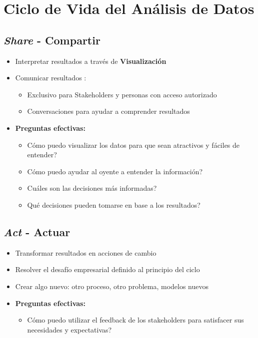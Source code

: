 \section{Ciclo de Vida del Análisis de Datos}





\subsection{\textit{Share} - Compartir}
\begin{itemize}
    \item {Interpretar resultados a través de \textbf{Visualización}}
    \item {Comunicar resultados : 
    \begin{itemize}
        \item {Exclusivo para Stakeholders y personas con acceso autorizado}
        \item {Conversaciones para ayudar a comprender resultados}
    \end{itemize}}
    \item {\textbf{Preguntas efectivas:}
    \begin{itemize}
        \item {Cómo puedo visualizar los datos para que sean atractivos y fáciles de entender?}
        \item {Cómo puedo ayudar al oyente a entender la información?}
        \item {Cuáles son las decisiones más informadas?}
        \item {Qué decisiones pueden tomarse en base a los resultados?}
    \end{itemize}}
\end{itemize}

\subsection{\textit{Act} - Actuar}
\begin{itemize}
    \item {Transformar resultados en acciones de cambio}
    \item {Resolver el desafío empresarial definido al principio del ciclo}
    \item {Crear algo nuevo: otro proceso, otro problema, modelos nuevos}
    \item {\textbf{Preguntas efectivas: }
    \begin{itemize}
        \item {Cómo puedo utilizar el feedback de los stakeholders para satisfacer sus necesidades y expectativas?}
    \end{itemize}}
\end{itemize}

\newpage